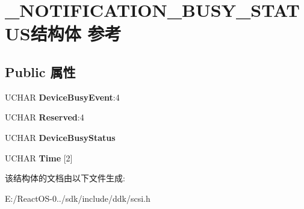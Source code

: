 \hypertarget{struct___n_o_t_i_f_i_c_a_t_i_o_n___b_u_s_y___s_t_a_t_u_s}{}\section{\+\_\+\+N\+O\+T\+I\+F\+I\+C\+A\+T\+I\+O\+N\+\_\+\+B\+U\+S\+Y\+\_\+\+S\+T\+A\+T\+U\+S结构体 参考}
\label{struct___n_o_t_i_f_i_c_a_t_i_o_n___b_u_s_y___s_t_a_t_u_s}
\subsection*{Public 属性}
\begin{DoxyCompactItemize}
\item 
\mbox{\label{struct___n_o_t_i_f_i_c_a_t_i_o_n___b_u_s_y___s_t_a_t_u_s_a29f3e05c66e7070fbf80703b3c1a1351}} 
U\+C\+H\+AR {\bfseries Device\+Busy\+Event}\+:4
\item 
\mbox{\label{struct___n_o_t_i_f_i_c_a_t_i_o_n___b_u_s_y___s_t_a_t_u_s_a1a0156b8cf67a9e18f4e425cbab00ce6}} 
U\+C\+H\+AR {\bfseries Reserved}\+:4
\item 
\mbox{\label{struct___n_o_t_i_f_i_c_a_t_i_o_n___b_u_s_y___s_t_a_t_u_s_ad885fa176f9be5cb5fce670296427ea7}} 
U\+C\+H\+AR {\bfseries Device\+Busy\+Status}
\item 
\mbox{\label{struct___n_o_t_i_f_i_c_a_t_i_o_n___b_u_s_y___s_t_a_t_u_s_ab8dc21b0fc5a365fa202d2ac31741b51}} 
U\+C\+H\+AR {\bfseries Time} \mbox{[}2\mbox{]}
\end{DoxyCompactItemize}


该结构体的文档由以下文件生成\+:\begin{DoxyCompactItemize}
\item 
E\+:/\+React\+O\+S-\/0../sdk/include/ddk/scsi.\+h\end{DoxyCompactItemize}

